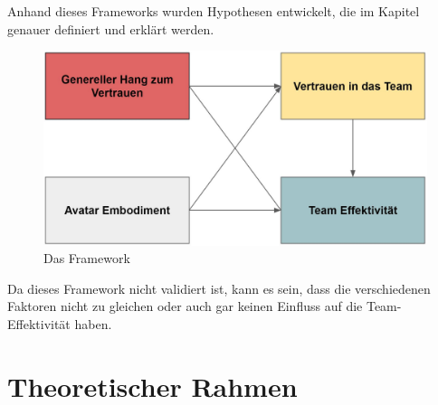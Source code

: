 \documentclass[a4paper,11pt]{article}%
\renewcommand{\\}{\vspace*{0.5\baselineskip} \newline}
\begin{document}
Anhand dieses Frameworks wurden Hypothesen entwickelt, die im Kapitel \textit{} genauer definiert und erklärt werden.

	\begin{figure}[H]
		\begin{footnotesize}
		\centering
			\includegraphics[scale=0.4]{Abbildungen/Framework_02.JPG}\\
			\caption[Abbildung 1]{Das Framework}
			\label{Framework}
		\end{footnotesize}
	\end{figure}

Da dieses Framework nicht validiert ist, kann es sein, dass die verschiedenen Faktoren nicht zu gleichen oder auch gar keinen Einfluss auf die Team-Effektivität haben.
%
%
%
%

	\newpage
\section{Theoretischer Rahmen}
\end{document}

